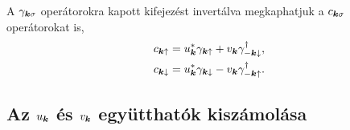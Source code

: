 \documentclass[a4paper,12pt,titlepage]{article}
\newcommand{\KK}{{\vb*{k}}}
\begin{document}
A $\gamma_{\KK \sigma}$ operátorokra kapott kifejezést invertálva megkaphatjuk a $c_{\KK \sigma}$ operátorokat is,
\begin{equation}
\begin{split}
	c_{\KK \uparrow} & = u_\KK^* \gamma_{\KK \uparrow} + v_\KK \gamma_{-\KK \downarrow}^\dagger, \\
	c_{\KK \downarrow} & = u_\KK^* \gamma_{\KK \downarrow} - v_\KK \gamma_{-\KK \uparrow}^\dagger.
\end{split}
\end{equation}


\subsection{Az $u_\KK$ és $v_\KK$ együtthatók kiszámolása}
\end{document}
